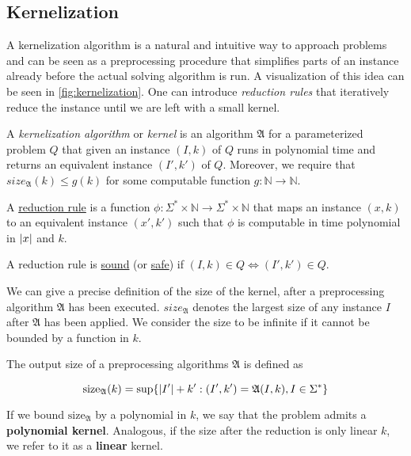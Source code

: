 \subsection{Kernelization}

A kernelization algorithm is a natural and intuitive way to approach problems and can be seen as a preprocessing procedure that simplifies parts of an instance already before the actual solving algorithm is run. 
A visualization of this idea can be seen in \cref{fig:kernelization}.
One can introduce \textit{reduction rules} that iteratively reduce the instance until we are left with a small kernel.   

\begin{definition}
A \textit{kernelization algorithm} or \textit{kernel} is an algorithm $\mathfrak{A}$ for a parameterized problem $Q$ that given an instance $(I,k)$ of $Q$ runs in polynomial time and returns an equivalent instance $(I', k')$ of $Q$. Moreover, we require that $size_{\mathfrak{A}}(k) \leq g(k)$ for some computable function $g:\mathbb{N} \rightarrow \mathbb{N}$.

A \underline{reduction rule} is a function $\phi:\Sigma^* \times \mathbb{N} \rightarrow \Sigma^* \times \mathbb{N}$ that maps an instance $(x,k)$ to an equivalent instance $(x',k')$ such that $\phi$ is computable in time polynomial in $\abs{x}$ and $k$.

A reduction rule is \underline{sound} (or \underline{safe}) if $(I, k) \in Q \Leftrightarrow (I',k') \in Q$.
\end{definition}

We can give a precise definition of the size of the kernel, after a preprocessing algorithm $\mathfrak{A}$ has been executed.
$size_{\mathfrak{A}}$ denotes the largest size of any instance $I$ after $\mathfrak{A}$ has been applied.
We consider the size to be infinite if it cannot be bounded by a function in $k$.

\begin{definition} The output size of a preprocessing algorithms $\mathfrak{A}$ is defined as 

    \[\mathrm{size}_{\mathfrak{A}}(k) = \sup\{\abs{I'} + k': (I',k')= \mathfrak{A}(I,k), I \in \Sigma^* \} \]
\end{definition}

If we bound $\mathrm{size}_{\mathfrak{A}}$ by a polynomial in $k$, we say that the problem admits a \textbf{polynomial kernel}.  
Analogous, if the size after the reduction is only linear $k$, we refer to it as a \textbf{linear} kernel.

